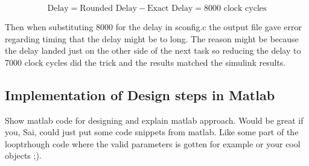\begin{equation}
\text{Delay}=\text{Rounded Delay} - \text{Exact Delay}= 8000 \text{ clock cycles}
\label{eq:delayall}
\end{equation}

Then when substituting 8000 for the delay in sconfig.c the output file gave error regarding timing that the delay might be to long. The reason might be because the delay landed just on the other side of the next task so reducing the delay to 7000 clock cycles did the trick and the results matched the simulink results.

\subsection{Implementation of Design steps in Matlab}
\color{red}
Show matlab code for designing and explain matlab approach. Would be great if you, Sai, could just put some code snippets from matlab. Like some part of the looptrhough code where the valid parameters is gotten for example or your cool objects ;).
\color{black}

\begin{lstlisting}[language=matlab,caption={Matlab code showing the loopthrough function }]
%Matlab code
\end{lstlisting}


